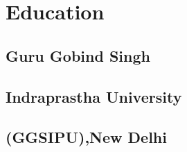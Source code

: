 \documentclass[]{deedy-resume-openfont}
\begin{document}
\begin{minipage}[t][0pt]{0.33\textwidth}




\section{Education} 

\subsection{Guru Gobind Singh}
\subsection{Indraprastha University}
\subsection{(GGSIPU),New Delhi}





%
%

\end{minipage} 
\hfill
\end{document}
